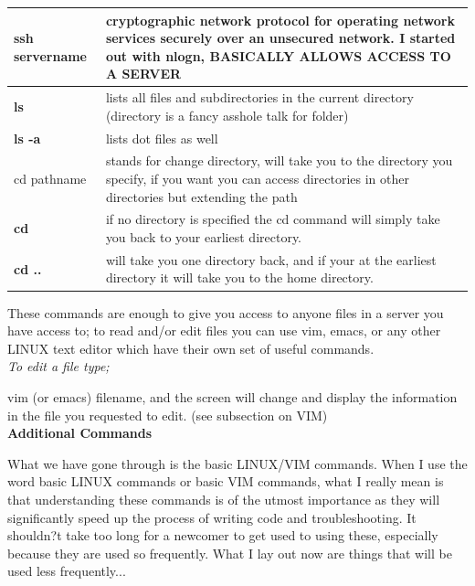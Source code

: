 \documentclass{article}
\begin{document}
\begin{center}
\begin{tabular*}{\textwidth}{ | p{} | p{}| }
\hline
 \textbf{ssh servername} & cryptographic network protocol for operating network services securely over an unsecured network. I started out with nlogn, BASICALLY ALLOWS ACCESS TO A SERVER\\ 
\hline 
 \textbf{ls} & lists all files and subdirectories in the current directory (directory is a fancy asshole talk for folder) \\  
\hline 
\textbf{ls -a} & lists dot files as well \\   
cd pathname & stands for change directory, will take you to the directory you specify, if you want you can access directories in other directories but extending the path \\
\hline
\textbf{cd} & if no directory is specified the cd command will simply take you back to your earliest directory. \\ 
\hline 
\textbf{cd ..} & will take you one directory back, and if your at the earliest directory it will take you to the home directory. \\ 
\hline 
\end{tabular*}
\end{center}

These commands are enough to give you access to anyone files in a server you have access to; to read and/or edit files you can use vim, emacs, or any other LINUX text editor which have their own set of useful commands. \\

\textit{To edit a file type;} 

vim (or emacs) filename,
and the screen will change and display the information in the file you requested to edit. (see subsection on VIM) \\

\textbf{Additional Commands}

What we have gone through is the basic LINUX/VIM commands. When I use the word basic LINUX commands or basic VIM commands, what I really mean is that understanding these commands is of the utmost importance as they will significantly speed up the process of writing code and troubleshooting. It shouldn?t take too long for a newcomer to get used to using these, especially because they are used so frequently. What I lay out now are things that will be used less frequently...
\end{document}
